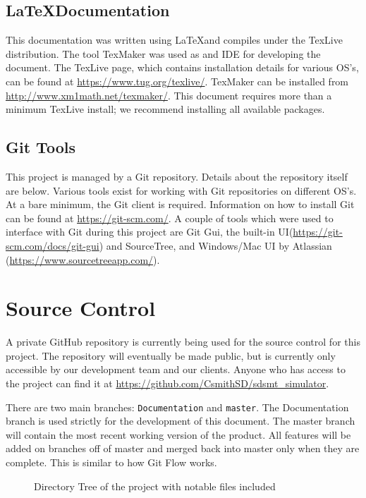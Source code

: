 \subsection{\LaTeX Documentation}
This documentation was written using \LaTeX and compiles under the TexLive distribution. The tool TexMaker was used as and IDE for developing the document.
The TexLive page, which contains installation details for various OS's, can be found at \url{https://www.tug.org/texlive/}. TexMaker can be installed from \url{http://www.xm1math.net/texmaker/}. This document requires more than a minimum TexLive install; we recommend installing all available packages.

\subsection{Git Tools}
This project is managed by a Git repository. Details about the repository itself are below. Various tools exist for working with Git repositories on different OS's. At a bare minimum, the Git client is required. Information on how to install Git can be found at \url{https://git-scm.com/}. A couple of tools which were used to interface with Git during this project are Git Gui, the built-in UI(\url{https://git-scm.com/docs/git-gui}) and SourceTree, and Windows/Mac UI by Atlassian (\url{https://www.sourcetreeapp.com/}).

\section{Source  Control}
A private GitHub repository is currently being used for the source control for this project. The repository will eventually be made public, but is currently only accessible by our development team and our clients. Anyone who has access to the project can find it at \url{https://github.com/CsmithSD/sdsmt_simulator}.

There are two main branches: \lstinline|Documentation| and \lstinline|master|. The Documentation branch is used strictly for the development of this document. The master branch will contain the most recent working version of the product. All features will be added on branches off of master and merged back into master only when they are complete. This is similar to how Git Flow works.

\begin{figure}
\centering
\begin{subfigure}{0.3\textwidth}
\end{subfigure}
\caption{Directory Tree of the project with notable files included}
\label{fig:dirtree}
\end{figure}

